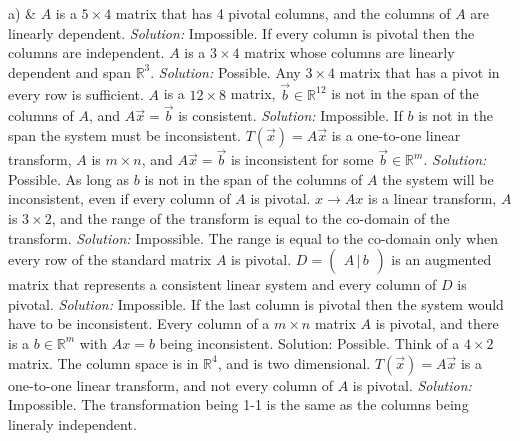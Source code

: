 a) &  
\ifnum {}         
    $A$ is a $5\times4$ matrix that has 4 pivotal columns, and the columns of $A$ are linearly dependent.
    \ifnum {} {\color{DarkBlue} \textit{Solution:  } Impossible. If every column is pivotal then the columns are independent. } \fi
\fi
\ifnum {}      
    $A$ is a $3\times4$ matrix whose columns are linearly dependent and span $\mathbb R^3$.
    \ifnum {} {\color{DarkBlue} \textit{Solution:  } Possible. Any $3\times4$ matrix that has a pivot in every row is sufficient. } \fi
\fi    
\ifnum {}  
    $A$ is a $12\times8$ matrix, $\vec b \in \mathbb R^{12}$ is not in the span of the columns of $A$, and $A\vec x = \vec b$ is consistent.
    \ifnum {} {\color{DarkBlue} \textit{Solution:  } Impossible. If $b$ is not in the span the system must be inconsistent. } \fi
\fi    
\ifnum {}    
    $T(\vec x) = A\vec x$ is a one-to-one linear transform, $A$ is $m\times n$, and $A\vec x = \vec b$ is inconsistent for some $\vec b \in \mathbb R^m$.
    \ifnum {} {\color{DarkBlue} \textit{Solution:  } Possible. As long as $b$ is not in the span of the columns of $A$ the system will be inconsistent, even if every column of $A$ is pivotal. } \fi
\fi   
\ifnum {}    
    $x\to Ax$ is a linear transform, $A$ is $3\times2$, and the range of the transform is equal to the co-domain of the transform. 
    \ifnum {} {\color{DarkBlue} \textit{Solution:  } Impossible. The range is equal to the co-domain only when every row of the standard matrix $A$ is pivotal.  } \fi
\fi    
\ifnum {}      
    \setlength{\extrarowheight}{0.00cm} $D = \begin{pmatrix} A \, | \, b\end{pmatrix}$ is an augmented matrix that represents a consistent linear system and every column of $D$ is pivotal. 
    \ifnum {} {\color{DarkBlue} \textit{Solution:  } Impossible. If the last column is pivotal then the system would have to be inconsistent.  } \fi
\fi      
\ifnum {}  
   Every column of a $m\times n$ matrix $A$ is pivotal, and there is a $b\in \mathbb R^m$ 
   with $Ax=b$ being inconsistent. 
    \ifnum {} {\color{DarkBlue} Solution: Possible. Think of a $4\times 2$ matrix. The column space is in $\mathbb R^4$, and is two dimensional. } \fi
\fi      
\ifnum {}
     $T(\vec x) = A\vec x$ is a one-to-one linear transform, and not every column of $A$ is pivotal.
    \ifnum {} {\color{DarkBlue} \textit{Solution:  } Impossible. The transformation being 1-1 is the same as the columns being lineraly independent. } \fi
